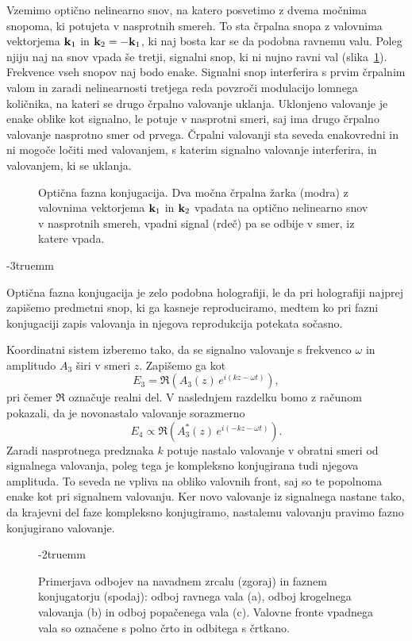 Vzemimo optično nelinearno snov, na katero posvetimo z dvema močnima 
snopoma, ki potujeta v nasprotnih smereh. To sta črpalna snopa z valovnima vektorjema
${\bf k}_{1}$ in ${\bf k}_2 = -{\bf k}_{1}$, ki naj bosta kar se da podobna ravnemu valu. 
Poleg njiju naj na snov vpada
še tretji, signalni snop, ki ni nujno ravni val (slika~\ref{08_OPC1}). 
Frekvence vseh snopov naj bodo enake.
Signalni snop interferira s prvim črpalnim valom in zaradi nelinearnosti 
tretjega reda povzroči modulacijo lomnega količnika, na kateri se
drugo črpalno valovanje uklanja. Uklonjeno valovanje je enake oblike
kot signalno, le potuje v nasprotni smeri, saj ima drugo črpalno valovanje
nasprotno smer od prvega. Črpalni valovanji sta seveda enakovredni in ni
mogoče ločiti med valovanjem, s katerim signalno valovanje interferira, in valovanjem, 
ki se uklanja.

\begin{figure}[ht]
\centering
\def\svgwidth{60truemm} 

\caption{Optična fazna konjugacija. Dva močna črpalna žarka (modra) z valovnima
vektorjema ${\bf k}_{1}$ in ${\bf k}_2$ vpadata na optično nelinearno snov v 
nasprotnih smereh, vpadni signal (rdeč) pa se odbije v 
smer, iz katere vpada.}
\label{08_OPC1}
\end{figure}
\vglue-3truemm
\begin{remark}Optična fazna konjugacija je zelo podobna holografiji, 
le da pri holografiji najprej zapišemo predmetni snop, ki ga kasneje reproduciramo, 
medtem ko pri fazni konjugaciji zapis valovanja in njegova reprodukcija 
potekata sočasno. 
\end{remark}

Koordinatni sistem izberemo tako, da se signalno valovanje s frekvenco $\omega$ in amplitudo $A_3$
širi v smeri $z$. Zapišemo ga kot
\begin{equation}
E_{3}=\mathfrak{\Re}\left(A_3\left(z\right)\, e^{i\left(kz-\omega t\right)}\right)\!,
\label{8.97}
\end{equation}
pri čemer $\mathfrak{\Re}$ označuje realni del. 
V naslednjem razdelku bomo z računom pokazali, da je novonastalo valovanje sorazmerno
\begin{equation}
E_{4} \propto \mathfrak{\Re}\left(A_3^{*}\left(z\right)\, e^{i\left(-kz-\omega t\right)}\right)\!.
\label{8.98}
\end{equation}
Zaradi nasprotnega predznaka $k$ potuje nastalo valovanje v obratni smeri od signalnega
valovanja, poleg tega je kompleksno konjugirana tudi njegova amplituda. To seveda
ne vpliva na obliko valovnih front, saj so te popolnoma enake kot pri signalnem
valovanju. Ker novo valovanje iz signalnega nastane tako,
da krajevni del faze kompleksno konjugiramo, nastalemu valovanju pravimo fazno
konjugirano valovanje.
\begin{figure}[ht]
\centering
\def\svgwidth{110truemm} 

\caption{Primerjava odbojev na navadnem zrcalu (zgoraj) in faznem konjugatorju (spodaj): odboj ravnega
vala (a), odboj krogelnega valovanja (b) in odboj popačenega vala (c). Valovne fronte 
vpadnega vala so označene s polno črto in odbitega s črtkano.}
\label{08_OPC2}
\vglue-2truemm
\end{figure}

